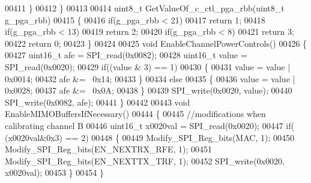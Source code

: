 \begin{DoxyCode}
00411     \}
00412 \}
00413 
00414 uint8\_t GetValueOf_c_ctl_pga_rbb(uint8\_t g\_pga\_rbb)
00415 \{
00416     \textcolor{keywordflow}{if}(g\_pga\_rbb < 21)
00417         \textcolor{keywordflow}{return} 1;
00418     \textcolor{keywordflow}{if}(g\_pga\_rbb < 13)
00419         \textcolor{keywordflow}{return} 2;
00420     \textcolor{keywordflow}{if}(g\_pga\_rbb < 8)
00421         \textcolor{keywordflow}{return} 3;
00422     \textcolor{keywordflow}{return} 0;
00423 \}
00424 
00425 \textcolor{keywordtype}{void} EnableChannelPowerControls()
00426 \{
00427     uint16\_t afe = SPI_read(0x0082);
00428     uint16\_t value = SPI_read(0x0020);
00429     \textcolor{keywordflow}{if}((value & 3) == 1)
00430     \{
00431         value = value | 0x0014;
00432         afe &= ~0x14;
00433     \}
00434     \textcolor{keywordflow}{else}
00435     \{
00436         value = value | 0x0028;
00437         afe &= ~0x0A;
00438     \}
00439     SPI_write(0x0020, value);
00440     SPI_write(0x0082, afe);
00441 \}
00442 
00443 \textcolor{keywordtype}{void} EnableMIMOBuffersIfNecessary()
00444 \{
00445 \textcolor{comment}{//modifications when calibrating channel B}
00446     uint16\_t x0020val = SPI_read(0x0020);
00447     \textcolor{keywordflow}{if}( (x0020val&0x3) == 2)
00448     \{
00449         Modify_SPI_Reg_bits(MAC, 1);
00450         Modify_SPI_Reg_bits(EN_NEXTRX_RFE, 1);
00451         Modify_SPI_Reg_bits(EN_NEXTTX_TRF, 1);
00452         SPI_write(0x0020, x0020val);
00453     \}
00454 \}
\end{DoxyCode}
